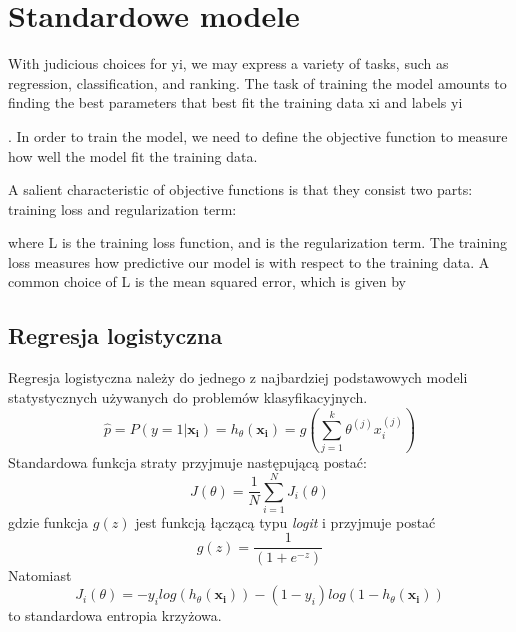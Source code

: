 \documentclass{book}
\begin{document}

\section{Standardowe modele}

	
	With judicious choices for yi, we may express a variety of tasks, such as regression, classification, and ranking. The task of training the model amounts to finding the best parameters that best fit the training data xi and labels yi
	
	. In order to train the model, we need to define the objective function to measure how well the model fit the training data.
	
	A salient characteristic of objective functions is that they consist two parts: training loss and regularization term:

	
	where L
	is the training loss function, and is the regularization term. The training loss measures how predictive our model is with respect to the training data. A common choice of L is the mean squared error, which is given by

\subsection{Regresja logistyczna}
\label{reg-log}
	Regresja logistyczna należy do jednego z najbardziej podstawowych modeli statystycznych używanych do problemów klasyfikacyjnych. 
	\begin{equation}
		\hat{p} = P(y=1|\boldsymbol{x_i}) = h_{\theta}(\boldsymbol{x_i}) = g\left(\sum_{j=1}^k \theta^{(j)}x_i^{(j)} \right)
	\end{equation} 
	Standardowa funkcja straty przyjmuje następującą postać:
	$$ J(\theta) = \frac{1}{N} \sum_{i=1}^N J_i(\theta) $$
	gdzie funkcja $g(z)$ jest funkcją łączącą typu \textit{logit} i przyjmuje postać 
	$$ g(z) = \frac{1}{(1+e^{-z})} $$
	Natomiast 
	\begin{equation}
	\label{c-e}
		J_i(\theta) = -y_i log(h_{\theta}(\boldsymbol{x_i})) - (1-y_i) log(1 - h_{\theta}(\boldsymbol{x_i}))
	\end{equation}
	$$  $$
	 to standardowa entropia krzyżowa.

\end{document}
